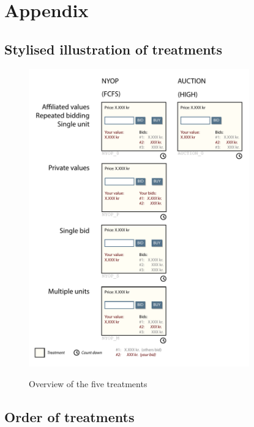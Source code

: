 \documentclass[a4paper,12pt]{article}
\begin{document}
	\newpage
	\section{Appendix}

	\subsection{Stylised illustration of treatments}
	\label{app:stylised_treatments}
	
	\begin{figure}[h]
	        \centering
	        \caption{Overview of the five treatments}
	        \includegraphics[width=0.85\textwidth]{Figures/Treatments}
			\label{fig:treatments}
	\end{figure}
	
	\newpage
	
	\subsection{Order of treatments}
	\label{app:order_treatments}
	
\end{document}

